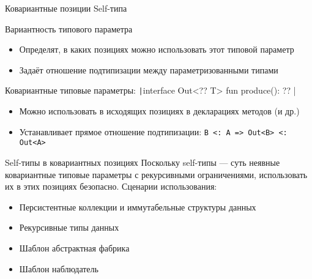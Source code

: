 \documentclass[aspectratio=169,usenames,dvipsnames]{beamer}
\begin{document}
    \begin{frame}{Ковариантные позиции Self-типа}
        \begin{block}{Вариантность типового параметра}
            \begin{itemize}
                \item Определят, в каких позициях можно использовать этот типовой параметр
                \item Задаёт отношение подтипизации между параметризованными типами
            \end{itemize}
        \end{block}
        \pause
        \begin{block}{Ковариантные типовые параметры: \texttt|interface Out<?? T> { fun produce(): ?? }|}
            \begin{itemize}
                \item Можно использовать в исходящих позициях в декларациях методов (и др.)
                \item Устанавливает прямое отношение подтипизации: \texttt{B <: A => Out<B> <: Out<A>}
            \end{itemize}
        \end{block}
        \pause
        \begin{block}{Self-типы в ковариантных позициях}
            Поскольку self-типы --- суть неявные ковариантные типовые параметры с рекурсивными ограничениями, использовать их в этих позициях безопасно.
            Сценарии использования:
            \begin{itemize}
                \item Персистентные коллекции и иммутабельные структуры данных
                \item Рекурсивные типы данных
                \item Шаблон абстрактная фабрика
                \item Шаблон наблюдатель
            \end{itemize}
        \end{block}
    \end{frame}
\end{document}
